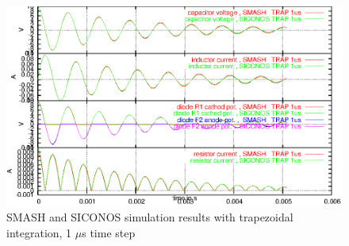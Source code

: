 \documentclass[10pt]{article}
\begin{document}
\begin{figure}[hbt]
\begin{center}
\includegraphics[width=12cm]{comp_SMASH_SICONOS_TRAP1us.eps}
\end{center}
\caption{SMASH and SICONOS simulation results with trapezoidal integration, 1 $\mu$s time step}
\label{fig-comp-SMASH-SICONOS-TRAP1us}
\end{figure}
\end{document}
